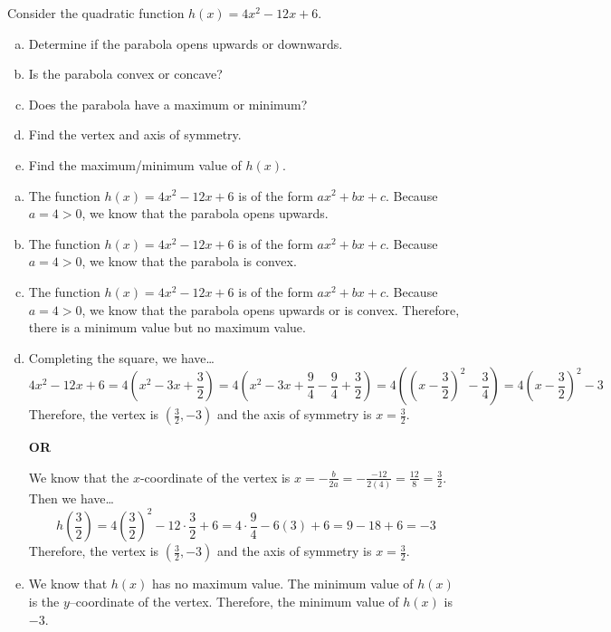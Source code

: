 \documentclass[11pt,letterpaper]{article}
\begin{document}
\newpage



 Consider the quadratic function $h(x)= 4x^2 - 12x + 6$.
        \begin{enumerate}[(a)]
        \item Determine if the parabola opens upwards or downwards.
        \item Is the parabola convex or concave?
        \item Does the parabola have a maximum or minimum? 
        \item Find the vertex and axis of symmetry. 
        \item Find the maximum/minimum value of $h(x)$. 
        \end{enumerate} \pspace

\sol
\begin{enumerate}[(a)]
\item The function $h(x)= 4x^2 - 12x + 6$ is of the form $ax^2 + bx + c$. Because $a= 4 > 0$, we know that the parabola opens upwards. \pspace

\item The function $h(x)= 4x^2 - 12x + 6$ is of the form $ax^2 + bx + c$. Because $a= 4 > 0$, we know that the parabola is convex.\pspace

\item The function $h(x)= 4x^2 - 12x + 6$ is of the form $ax^2 + bx + c$. Because $a= 4 > 0$, we know that the parabola opens upwards or is convex. Therefore, there is a minimum value but no maximum value. \pspace

\item Completing the square, we have\dots
	\[
	4x^2 - 12x + 6= 4 \left( x^2 - 3x + \dfrac{3}{2} \right)= 4 \left( x^2 - 3x + \dfrac{9}{4} - \dfrac{9}{4} + \dfrac{3}{2} \right)= 4 \left( \left(x - \dfrac{3}{2} \right)^2 - \dfrac{3}{4} \right)= 4\left( x - \dfrac{3}{2} \right)^2 - 3
	\]
Therefore, the vertex is $(\frac{3}{2}, -3)$ and the axis of symmetry is $x= \frac{3}{2}$. 

\begin{center} {\bfseries OR} \end{center}

We know that the $x$-coordinate of the vertex is $x= -\frac{b}{2a}= -\frac{-12}{2(4)}= \frac{12}{8}= \frac{3}{2}$. Then we have\dots
	\[
	h\left( \dfrac{3}{2} \right)= 4 \left( \dfrac{3}{2} \right)^2 - 12 \cdot \dfrac{3}{2} + 6= 4 \cdot \dfrac{9}{4} - 6(3) + 6= 9 - 18 + 6= -3
	\]
Therefore, the vertex is $(\frac{3}{2}, -3)$ and the axis of symmetry is $x= \frac{3}{2}$. \pspace

\item We know that $h(x)$ has no maximum value. The minimum value of $h(x)$ is the $y$--coordinate of the vertex. Therefore, the minimum value of $h(x)$ is $-3$. 
\end{enumerate}
\end{document}
